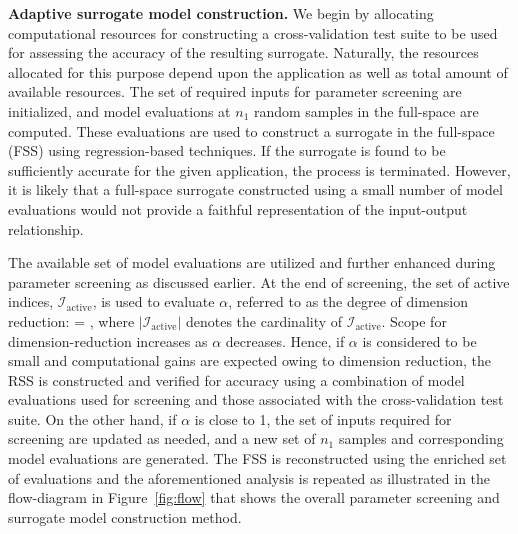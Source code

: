 \textbf{Adaptive surrogate model construction.}
%
We begin by allocating computational resources for constructing a cross-validation
test suite to be used for assessing the accuracy of the resulting surrogate.
Naturally, the resources allocated for this purpose depend upon the application
as well as total amount of available resources. 
The set of required inputs for parameter screening are initialized,
and model evaluations at $n_1$ random samples in the full-space are computed.
These evaluations are used to construct a surrogate in the full-space (FSS)
using regression-based techniques. If the surrogate is found to be sufficiently
accurate for the given application, the process is terminated. However, it is
likely that a full-space surrogate constructed using a 
small number of model evaluations would not provide a 
faithful representation of the input-output relationship.  

The available set of model evaluations are utilized and further enhanced during
parameter screening as discussed earlier.  At the end of screening, the set of
active indices, $\mathcal{I}_\text{active}$, is used to evaluate $\alpha$, referred
to as the degree of dimension reduction:
%
\be
\alpha = ,
\label{eq:alpha}
\ee
%
where $|\mathcal{I}_\text{active}|$ denotes the cardinality of
$\mathcal{I}_\text{active}$.  Scope for dimension-reduction increases as
$\alpha$ decreases.  Hence, if $\alpha$ is considered to be small and
computational gains are expected owing to dimension reduction, the RSS is
constructed and verified for accuracy using a combination of model evaluations
used for screening and those associated with the cross-validation test suite.  On the
other hand, if $\alpha$ is close to 1, the set of inputs required for screening are
 updated as needed, and a
new set of $n_1$ samples and corresponding model evaluations are generated. The
FSS is reconstructed using the enriched set of evaluations and the
aforementioned analysis is repeated as illustrated in the flow-diagram
in Figure~\ref{fig:flow} that shows the overall 
parameter screening and surrogate model construction method.

